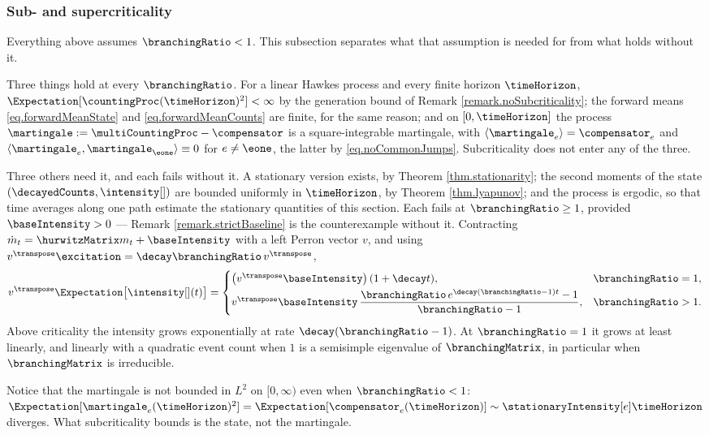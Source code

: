 \subsubsection{Sub- and supercriticality}

Everything above assumes $\branchingRatio < 1$.
This subsection separates what that assumption is needed for from what holds without it.

Three things hold at every $\branchingRatio$.
For a linear Hawkes process and every finite horizon $\timeHorizon$,
$\Expectation[\countingProc(\timeHorizon)^2] < \infty$
by the generation bound of Remark \ref{remark.noSubcriticality};
the forward means \eqref{eq.forwardMeanState} and \eqref{eq.forwardMeanCounts} are finite,
for the same reason;
and on $[0,\timeHorizon]$ the process
$\martingale := \multiCountingProc - \compensator$
is a square-integrable martingale,
with $\langle \martingale_e \rangle = \compensator_e$
and $\langle \martingale_e, \martingale_{\eone} \rangle \equiv 0$ for $e \neq \eone$,
the latter by \eqref{eq.noCommonJumps}.
Subcriticality does not enter any of the three.

Three others need it, and each fails without it.
A stationary version exists, by Theorem \ref{thm.stationarity};
the second moments of the state $(\decayedCounts, \intensity[ ])$ are bounded uniformly in
$\timeHorizon$, by Theorem \ref{thm.lyapunov};
and the process is ergodic, so that time averages along one path estimate the stationary
quantities of this section.
Each fails at $\branchingRatio \geq 1$, provided $\baseIntensity > 0$ ---
Remark \ref{remark.strictBaseline} is the counterexample without it.
Contracting $\dot m_{t} = \hurwitzMatrix m_{t} + \baseIntensity$ with a left Perron
vector $v$, and using $v^{\transpose}\excitation = \decay\branchingRatio\, v^{\transpose}$,
\begin{equation}\label{eq.supercriticalGrowth}
 v^{\transpose} \Expectation \big[ \intensity[ ](t) \big]
 = \begin{cases}
   \big( v^{\transpose}\baseIntensity \big)\,(1 + \decay t),
   & \branchingRatio = 1, \\[2pt]
   v^{\transpose}\baseIntensity \,
   \dfrac{\branchingRatio\, e^{\decay(\branchingRatio-1)t} - 1}{\branchingRatio - 1},
   & \branchingRatio > 1 .
 \end{cases}
\end{equation}
Above criticality the intensity grows exponentially at rate $\decay(\branchingRatio-1)$.
At $\branchingRatio = 1$ it grows at least linearly,
and linearly with a quadratic event count when $1$ is a semisimple eigenvalue of
$\branchingMatrix$, in particular when $\branchingMatrix$ is irreducible.

\begin{remark}\label{remark.martingaleNotBounded}
 Notice that the martingale is not bounded in $L^{2}$ on $[0,\infty)$ even when
 $\branchingRatio<1$:
 $\Expectation[\martingale_e(\timeHorizon)^2]
 = \Expectation[\compensator_e(\timeHorizon)]
 \sim \stationaryIntensity[e] \timeHorizon$ diverges.
 What subcriticality bounds is the state, not the martingale.
\end{remark}
